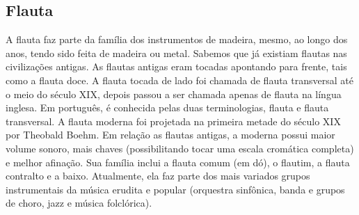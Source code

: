 \subsection*{Flauta}

A flauta faz parte da família dos instrumentos de madeira,
mesmo, ao longo dos anos, tendo sido feita de madeira ou
metal. Sabemos que já existiam flautas nas civilizações antigas. As
flautas antigas eram tocadas apontando para frente, tais como a flauta
doce. A flauta tocada de lado foi chamada de flauta transversal até o
meio do século XIX, depois passou a ser chamada apenas de flauta na
língua inglesa. Em português, é conhecida pelas duas terminologias,
flauta e flauta transversal. A flauta moderna foi projetada na
primeira metade do século XIX por Theobald Boehm. Em relação as
flautas antigas, a moderna possui maior volume sonoro, mais chaves
(possibilitando tocar uma escala cromática completa) e melhor
afinação. Sua família inclui a flauta comum (em dó), o flautim, a
flauta contralto e a baixo. Atualmente, ela faz parte dos mais
variados grupos instrumentais da música erudita e popular (orquestra
sinfônica, banda e grupos de choro, jazz e música folclórica).